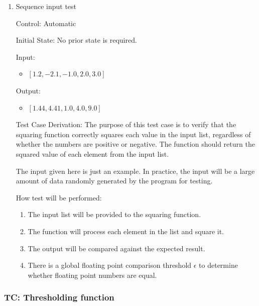 \documentclass[12pt, titlepage]{article}
\begin{document}
\begin{enumerate}

  \item{Sequence input test\\}
  
  Control: Automatic
            
  Initial State: No prior state is required.
            
  Input:
  \begin{itemize}
    \item $[1.2, -2.1, -1.0, 2.0, 3.0]$
  \end{itemize}
  
  Output:
  \begin{itemize}
    \item $[1.44, 4.41, 1.0, 4.0, 9.0]$
  \end{itemize}
  
  Test Case Derivation: The purpose of this test case is to verify that the
  squaring function correctly squares each value in the input list, regardless
  of whether the numbers are positive or negative. The function should return
  the squared value of each element from the input list.

  The input given here is just an example.  In practice, the input will be a
  large amount of data randomly generated by the program for testing.
            
  How test will be performed: 
  \begin{enumerate}
    \item The input list will be provided to the squaring function.
    \item The function will process each element in the list and square it.
    \item The output will be compared against the expected result.
    \item There is a global floating point comparison threshold $\epsilon$ to
    determine whether floating point numbers are equal.
  \end{enumerate}

\end{enumerate}

 \label{TC_THRESHOLDING}
\subsubsection{TC\thetestcasenum : Thresholding function}
\end{document}
